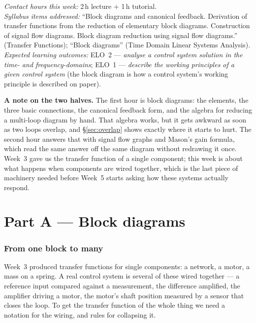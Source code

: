\documentclass[11pt,a4paper]{article}
\begin{document}
\noindent
\emph{Contact hours this week:} 2\,h lecture $+$ 1\,h tutorial.\\
\emph{Syllabus items addressed:} ``Block diagrams and canonical feedback.
Derivation of transfer functions from the reduction of elementary block
diagrams. Construction of signal flow diagrams. Block diagram reduction using
signal flow diagrams.'' (Transfer Functions); ``Block diagrams'' (Time Domain
Linear Systems Analysis).\\
\emph{Expected learning outcomes:} ELO~2 --- \emph{analyse a control system
solution in the time- and frequency-domains}; ELO~1 --- \emph{describe the
working principles of a given control system} (the block diagram is how a
control system's working principle is described on paper).

\bigskip
\noindent
\textbf{A note on the two halves.} The first hour is block diagrams: the
elements, the three basic connections, the canonical feedback form, and the
algebra for reducing a multi-loop diagram by hand. That algebra works, but it
gets awkward as soon as two loops overlap, and \S\ref{sec:overlap} shows exactly
where it starts to hurt. The second hour answers that with signal flow graphs
and Mason's gain formula, which read the same answer off the same diagram
without redrawing it once. Week~3 gave us the transfer function of a single
component; this week is about what happens when components are wired together,
which is the last piece of machinery needed before Week~5 starts asking how
these systems actually respond.

\part*{Part A --- Block diagrams}

\section{From one block to many}
\label{sec:elements}

Week~3 produced transfer functions for single components: a network, a motor, a
mass on a spring. A real control system is several of these wired together ---
a reference input compared against a measurement, the difference amplified,
the amplifier driving a motor, the motor's shaft position measured by a sensor
that closes the loop. To get the transfer function of the whole thing we need a
notation for the wiring, and rules for collapsing it.
\end{document}
